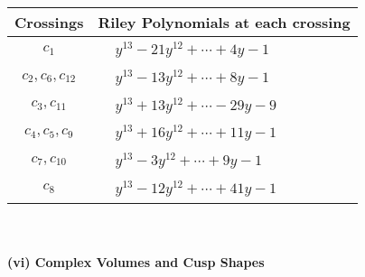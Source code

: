 \documentclass[1p]{elsarticle_modified}
\theoremstyle{definition}
\begin{document}
\begin{tabular}{m{50pt}|m{274pt}}
Crossings & \hspace{64pt}Riley Polynomials at each crossing \\
\hline $$\begin{aligned}c_{1}\end{aligned}$$&$\begin{aligned}
&y^{13}-21 y^{12}+\cdots+4 y-1
\end{aligned}$\\
\hline $$\begin{aligned}c_{2},c_{6},c_{12}\end{aligned}$$&$\begin{aligned}
&y^{13}-13 y^{12}+\cdots+8 y-1
\end{aligned}$\\
\hline $$\begin{aligned}c_{3},c_{11}\end{aligned}$$&$\begin{aligned}
&y^{13}+13 y^{12}+\cdots-29 y-9
\end{aligned}$\\
\hline $$\begin{aligned}c_{4},c_{5},c_{9}\end{aligned}$$&$\begin{aligned}
&y^{13}+16 y^{12}+\cdots+11 y-1
\end{aligned}$\\
\hline $$\begin{aligned}c_{7},c_{10}\end{aligned}$$&$\begin{aligned}
&y^{13}-3 y^{12}+\cdots+9 y-1
\end{aligned}$\\
\hline $$\begin{aligned}c_{8}\end{aligned}$$&$\begin{aligned}
&y^{13}-12 y^{12}+\cdots+41 y-1
\end{aligned}$\\
\hline
\end{tabular}\\~\\
\newpage\flushleft \textbf{(vi) Complex Volumes and Cusp Shapes}
\end{document}
